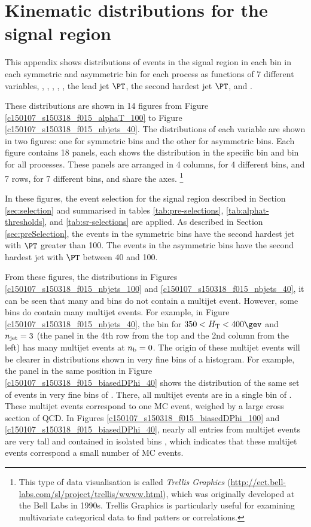 \section{Kinematic distributions for the signal region}
\label{sec:kisigplot}

This appendix shows distributions of events in the signal region in
each \scalht bin in each symmetric and asymmetric \njet bin for each
process as functions of 7 different variables, \ie, \alphat, \mht,
\bdphi, \met, the lead jet $\PT$, the second hardest jet $\PT$, and
\nb.

These distributions are shown in 14 figures from Figure
\ref{c150107_s150318_f015_alphaT_100} to Figure
\ref{c150107_s150318_f015_nbjets_40}. The distributions of each variable
are shown in two figures: one for symmetric \njet bins and the other for
asymmetric \njet bins. Each figure contains 18 panels, each shows the
distribution in the specific \scalht bin and \njet bin for all
processes. These panels are arranged in 4 columns, for 4 different \njet
bins, and 7 rows, for 7 different \scalht bins, and share the axes.
\footnote{This type of data visualisation is called \textit{Trellis
Graphics} (\url{http://ect.bell-labs.com/sl/project/trellis/wwww.html}),
which was originally developed at the Bell Labs in 1990s. Trellis
Graphics is particularly useful for examining multivariate categorical
data \eg to find patters or correlations.}


In these figures, the event selection for the signal region described
in Section \ref{sec:selection} and summarised in tables
\ref{tab:pre-selections}, \ref{tab:alphat-thresholds}, and
\ref{tab:sr-selections} are applied. As described in Section
\ref{sec:preSelection}, the events in the symmetric \njet bins have
the second hardest jet with $\PT$ greater than 100\gev. The events in
the asymmetric \njet bins have the second hardest jet with $\PT$
between 40 and 100\gev.

From these figures, \eg the \nb distributions in Figures
\ref{c150107_s150318_f015_nbjets_100} and
\ref{c150107_s150318_f015_nbjets_40}, it can be seen that many \scalht
and \njet bins do not contain a multijet event. However, some bins do
contain many multijet events. For example, in Figure
\ref{c150107_s150318_f015_nbjets_40}, the bin for $350 < \scalht <
400\gev$ and $n_{\text{jet}} = 3$ (the panel in the 4th row from the top and
the 2nd column from the left) has many multijet events at $n_{\text{b}} = 0$.
The origin of these multijet events will be clearer in distributions
shown in very fine bins of a histogram. For example, the panel in the
same position in Figure \ref{c150107_s150318_f015_biasedDPhi_40} shows
the distribution of the same set of events in very fine bins of
\bdphi. There, all multijet events are in a single bin of \bdphi.
These multijet events correspond to one MC event, weighed by a large
cross section of QCD. In Figures
\ref{c150107_s150318_f015_biasedDPhi_100} and
\ref{c150107_s150318_f015_biasedDPhi_40}, nearly all entries from
multijet events are very tall and contained in isolated bins \bdphi,
which indicates that these multijet events correspond a small number
of MC events.

